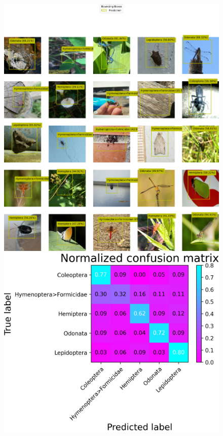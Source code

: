 \begin{figure}
    \centering
    \begin{multicols}{2}
        \begin{minipage}{.45\textwidth}
            \includegraphics[width=\textwidth]{images/two-stage-model-predictions.png}
        \end{minipage}
        \columnbreak
        \begin{minipage}{.45\textwidth}
            \includegraphics[width=\textwidth]{images/two-stage-model-confusion.png}

\end{minipage}
\end{multicols}
\end{figure}
